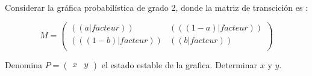 \exercice
Considerar la gráfica probabilística de grado 2, donde la matriz de transcición es :

\[
M=\begin{pmatrix}
  (( a|facteur )) & (( (1-a)|facteur )) \\
  (( (1-b)|facteur )) & (( b|facteur )) \\
\end{pmatrix}
\]

Denomina $P=\begin{pmatrix}x&y\end{pmatrix}$ el estado estable de la grafica. Determinar $x$ y $y$.
